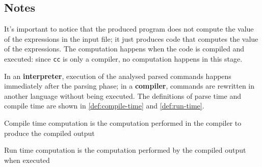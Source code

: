 \subsection{Notes}

It's important to notice that the produced program does not compute the value of the expressions in the input file;
it just produces \clang code that computes the value of the expressions.
The computation happens when the \clang code is compiled and executed:
since \texttt{cc} is only a compiler, no computation happens in this stage.

In an \textbf{interpreter}, execution of the analysed parsed commands happens immediately after the parsing phase;
in a \textbf{compiler}, commands are rewritten in another language without being executed.
The definitions of parse time and compile time are shown in \ref{def:compile-time} and \ref{def:run-time}.

\begin{definition}
  \label{def:compile-time}
  Compile time computation is the computation performed in the compiler to produce the compiled output
\end{definition}

\begin{definition}
  \label{def:run-time}
  Run time computation is the computation performed by the compiled output when executed
\end{definition}